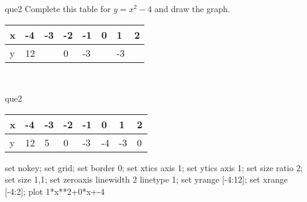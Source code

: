 \documentclass[13.5pt, varwidth=true]{beamer}
\begin{document}
\begin{frame}[shrink=19,fragile]
	\begin{beamercolorbox}[rounded=true, left, shadow=true,wd=14.8cm]{que2}
		 Complete this table for $y = x^{2} - 4$ and draw the graph. \\[0.3cm] \renewcommand{\arraystretch}{1.2}\begin{tabular}{|C|C|C|C|C|C|C|C|} \hline x & -4 & -3 & -2 & -1 & 0 & 1 & 2 \\ \hline y & 12 &  & 0 & -3 &  & -3 & \\ \hline \end{tabular}\\[0.3cm]
	\end{beamercolorbox}
\end{frame}
\begin{frame}[shrink=19,fragile]
	\begin{beamercolorbox}[rounded=true, left, shadow=true,wd=14.8cm]{que2}
		\renewcommand{\arraystretch}{1.2}\begin{tabular}{|C|C|C|C|C|C|C|C|} \hline x & -4 & -3 & -2 & -1 & 0 & 1 & 2 \\ \hline y & 12 & 5 & 0 & -3 & -4 & -3 & 0\\ \hline \end{tabular}\begin{gnuplot}[terminal=pdf] set nokey; set grid; set border 0; set xtics axis 1; set ytics axis 1; set size ratio 2; set size 1,1; set zeroaxis linewidth 2 linetype 1; set yrange [-4:12]; set xrange [-4:2]; plot 1*x**2+0*x+-4 \end{gnuplot}
	\end{beamercolorbox}
\end{frame}
\end{document}
